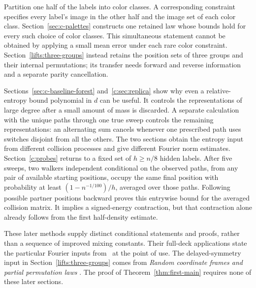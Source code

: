 Partition one half of the labels into color classes. A corresponding
constraint specifies every label's image in the other half and the
image set of each color class.
Section~\ref{sec:c-palettes} constructs one retained law whose bounds
hold for every such choice of color classes. This simultaneous
statement cannot be obtained by applying a small mean error under
each rare color constraint. Section~\ref{lifts:three-groups} instead
retains the position sets of three groups and their internal
permutations; its transfer needs forward and reverse information
and a separate parity cancellation.

Sections~\ref{sec:c-baseline-forest} and~\ref{c:sec:replica}
show why even a relative-entropy bound polynomial in $d$ can be
useful. It controls the representations of large degree after a
small amount of mass is discarded. A separate calculation with the
unique paths through one true sweep controls the remaining
representations: an alternating sum cancels whenever one prescribed
path uses switches disjoint from all the others. The two sections
obtain the entropy input from different collision processes and
give different Fourier norm estimates. Section~\ref{c:probes}
returns to a fixed set of $h\ge n/8$ hidden labels. After five sweeps,
two walkers independent conditional on the observed paths, from any pair
of available starting positions, occupy the same final position with probability at least
$(1-n^{-1/100})/h$, averaged over those paths. Following possible partner
positions backward proves this entrywise bound for the averaged collision
matrix. It implies a signed-energy contraction, but that contraction
alone already follows from the first half-density estimate.

These later methods supply distinct conditional statements and
proofs, rather than a sequence of improved mixing constants.
Their full-deck applications state the particular Fourier inputs
from~\cite{partialFourier} at the point of use. The delayed-symmetry
input in Section~\ref{lifts:three-groups} comes from
\emph{Random coordinate frames and partial permutation laws}
\cite{coordinateFrames}. The proof of Theorem~\ref{thm:first-main}
requires none of these later sections.
